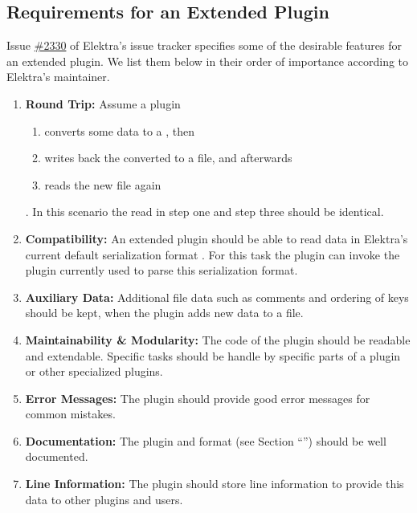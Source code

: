 \subsection{Requirements for an Extended  Plugin}
\label{sec:requirements_extended_yaml_plugin}

Issue \href{https://issues.libelektra.org/2330}{\#2330} of Elektra’s issue tracker specifies some of the desirable features for an extended  plugin. We list them below in their order of importance according to Elektra’s maintainer.

\begin{enumerate}
  \item \textbf{Round Trip:}
  Assume a plugin
  \begin{enumerate}
    \item converts some  data to a , then
    \item writes back the converted  to a  file, and afterwards
    \item reads the new  file again
  \end{enumerate}
  . In this scenario the  read in step one and step three should be identical.

  \item \textbf{Compatibility:} An extended  plugin should be able to read data in Elektra’s current default serialization format . For this task the plugin can invoke the plugin currently used to parse this serialization format.

  \item \textbf{Auxiliary Data:} Additional file data such as comments and ordering of keys should be kept, when the plugin adds new data to a  file.

  \item \textbf{Maintainability \& Modularity:} The code of the plugin should be readable and extendable. Specific tasks should be handle by specific parts of a plugin or other specialized plugins.

  \item \textbf{Error Messages:} The plugin should provide good error messages for common mistakes.

  \item \textbf{Documentation:} The  plugin and format (see Section “”) should be well documented.

  \item \textbf{Line Information:} The plugin should store line information to provide this data to other plugins and users.
\end{enumerate}


